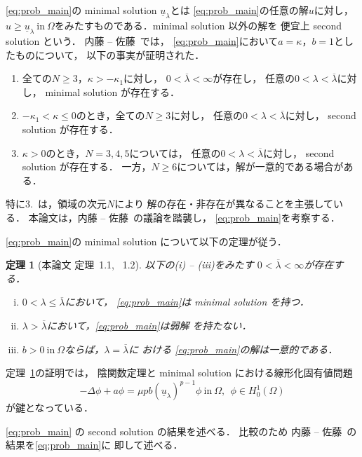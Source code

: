 \documentclass{jsarticle}
\newcommand{\sage}{
\addtolength{\itemindent}{1zw}
\addtolength{\parindent}{1zw}}
\theoremstyle{plain}
\newtheorem{thm}{定理}
\renewcommand{\bar}[1]{\overline{#1}}
\newcommand{\tin}{\text{in}~}
\begin{document}
\ref{eq:prob_main}の minimal solution $\underline{u}_\lambda$とは
\ref{eq:prob_main}の任意の解$u$に対し，$u \geq \underline{u}_\lambda
~\tin \Omega$をみたすものである．minimal solution 以外の解を
便宜上 second solution という．
内藤 -- 佐藤~\cite{MR2886160}では，
\ref{eq:prob_main}において$a = \kappa$，$b = 1$としたものについて，
以下の事実が証明された．
\begin{enumerate}[1.] \sage
 \item 全ての$N \geq 3$，$\kappa > - \kappa_1$に対し，
       $0 < \bar{\lambda} < \infty$が存在し，
       任意の$0 < \lambda < \bar{\lambda}$に対し，
       minimal solution が存在する．
 \item $-\kappa_1 < \kappa \leq 0$のとき，全ての$N \geq 3$に対し，
       任意の$0 < \lambda < \bar{\lambda}$に対し，
       second solution が存在する．
 \item $\kappa > 0$のとき，$N = 3, 4, 5$については，
       任意の$0 < \lambda < \bar{\lambda}$に対し，
       second solution が存在する．
       一方，$N \geq 6$については，解が一意的である場合がある．
\end{enumerate}
特に3.~は，領域の次元$N$により
解の存在・非存在が異なることを主張している．
本論文は，内藤 -- 佐藤~\cite{MR2886160}の議論を踏襲し，
\ref{eq:prob_main}を考察する．

\ref{eq:prob_main}の minimal solution について以下の定理が従う．
\begin{thm}[本論文 定理~1.1, ~1.2] \label{thm:minimal_solution}
以下の(i) -- (iii)をみたす
 $0 < \bar{\lambda} < \infty$が存在する．
 \begin{enumerate}[(i)]
  \item $0 < \lambda \leq \bar{\lambda}$において，
        \ref{eq:prob_main}は minimal solution を持つ．
  \item $\lambda > \bar{\lambda}$において，\ref{eq:prob_main}は弱解
        を持たない．
  \item $b > 0 ~\tin \Omega$ならば，$\lambda = \bar{\lambda}$に
        おける
        \ref{eq:prob_main}の解は一意的である．
 \end{enumerate}
\end{thm}

定理~\ref{thm:minimal_solution}の証明では，
陰関数定理と minimal solution における線形化固有値問題
\[
-\Delta \phi + a \phi = \mu p b (\underline{u}_\lambda)^{p-1} \phi
  ~\tin \Omega, \ \ \phi \in H_0^1(\Omega)
\] 
が鍵となっている．

\ref{eq:prob_main} の second solution の結果を述べる．
比較のため 内藤 -- 佐藤~\cite{MR2886160}の結果を\ref{eq:prob_main}に
即して述べる．
\end{document}
